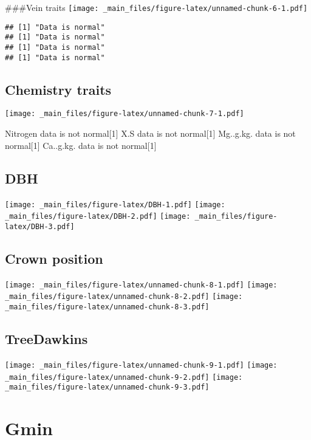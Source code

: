 \documentclass[
]{book}
\begin{document}
\#\#\#Vein traits
\texttt{[image: \_main\_files/figure-latex/unnamed-chunk-6-1.pdf]}

\begin{verbatim}
## [1] "Data is normal"
## [1] "Data is normal"
## [1] "Data is normal"
## [1] "Data is normal"
\end{verbatim}

\hypertarget{chemistry-traits}{%
\subsection{Chemistry traits}\label{chemistry-traits}}

\texttt{[image: \_main\_files/figure-latex/unnamed-chunk-7-1.pdf]}

Nitrogen data is not normal{[}1{]}
X.S data is not normal{[}1{]}
Mg..g.kg. data is not normal{[}1{]}
Ca..g.kg. data is not normal{[}1{]}

\hypertarget{dbh}{%
\subsection{DBH}\label{dbh}}

\texttt{[image: \_main\_files/figure-latex/DBH-1.pdf]} \texttt{[image: \_main\_files/figure-latex/DBH-2.pdf]} \texttt{[image: \_main\_files/figure-latex/DBH-3.pdf]}

\hypertarget{crown-position}{%
\subsection{Crown position}\label{crown-position}}

\texttt{[image: \_main\_files/figure-latex/unnamed-chunk-8-1.pdf]} \texttt{[image: \_main\_files/figure-latex/unnamed-chunk-8-2.pdf]} \texttt{[image: \_main\_files/figure-latex/unnamed-chunk-8-3.pdf]}

\hypertarget{treedawkins}{%
\subsection{TreeDawkins}\label{treedawkins}}

\texttt{[image: \_main\_files/figure-latex/unnamed-chunk-9-1.pdf]} \texttt{[image: \_main\_files/figure-latex/unnamed-chunk-9-2.pdf]} \texttt{[image: \_main\_files/figure-latex/unnamed-chunk-9-3.pdf]}

\hypertarget{gmin}{%
\section{Gmin}\label{gmin}}
\end{document}
